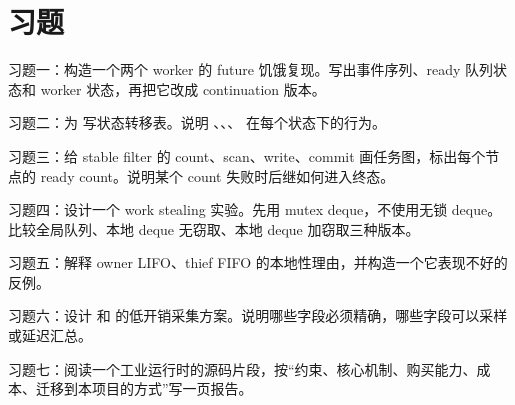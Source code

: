 \section{习题}

\begin{exercisebox}
习题一：构造一个两个 worker 的 future 饥饿复现。写出事件序列、ready 队列状态和 worker 状态，再把它改成 continuation 版本。

习题二：为  写状态转移表。说明 、、、 在每个状态下的行为。

习题三：给 stable filter 的 count、scan、write、commit 画任务图，标出每个节点的 ready count。说明某个 count 失败时后继如何进入终态。

习题四：设计一个 work stealing 实验。先用 mutex deque，不使用无锁 deque。比较全局队列、本地 deque 无窃取、本地 deque 加窃取三种版本。

习题五：解释 owner LIFO、thief FIFO 的本地性理由，并构造一个它表现不好的反例。

习题六：设计  和  的低开销采集方案。说明哪些字段必须精确，哪些字段可以采样或延迟汇总。

习题七：阅读一个工业运行时的源码片段，按“约束、核心机制、购买能力、成本、迁移到本项目的方式”写一页报告。
\end{exercisebox}

